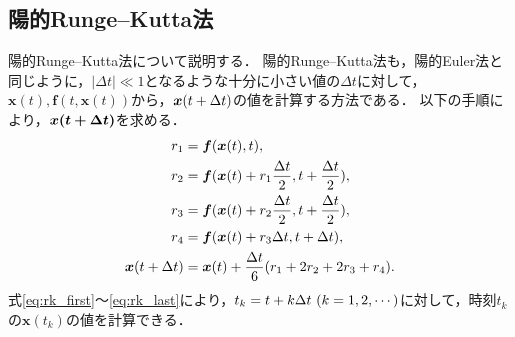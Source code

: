 \subsection{陽的Runge--Kutta法}
陽的Runge--Kutta法について説明する．
陽的Runge--Kutta法も，陽的Euler法と同じように，$|\Delta t| \ll 1 $となるような十分に小さい値の$\Delta t$に対して，$\bm{x}(t),\bm{f}(t,\bm{x}(t))$から，$\bm{x}(t + \Delta t )$の値を計算する方法である．
以下の手順により，$\bm{x(t + \Delta t)}$を求める．
\begin{align}
    r_1 &= \bm{f}(\bm{x}(t),t), \label{eq:rk_first}\\
    r_2 &= \bm{f}(\bm{x}(t)+r_1 \frac{\Delta t}{2},t + \frac{\Delta t}{2}), \\
    r_3 &= \bm{f}(\bm{x}(t)+r_2 \frac{\Delta t}{2}, t + \frac{\Delta t}{2}), \\
    r_4 &= \bm{f}(\bm{x}(t)+r_3 \Delta t, t + \Delta t), \\
    \bm{x}(t + \Delta t) &= \bm{x}(t) + \frac{\Delta t}{6}(r_1 + 2r_2 + 2r_3 + r_4). \label{eq:rk_last}
\end{align}
式\eqref{eq:rk_first}〜\eqref{eq:rk_last}により，$t_k = t + k\Delta t \ (k = 1,2,\cdots)$に対して，時刻$t_k$の$\bm{x}(t_k)$の値を計算できる．


